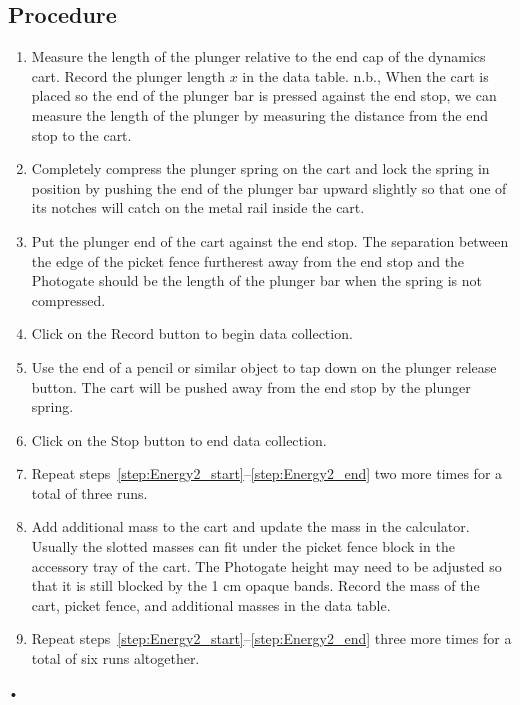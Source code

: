 \documentclass[main.tex]{subfiles}
\begin{document}
\subsection*{Procedure}
\begin{enumerate}
\item
Measure the length of the plunger relative to the end cap of the dynamics cart. Record the plunger length $x$ in the data table. n.b., When the cart is placed so the end of the plunger bar is pressed against the end stop, we can measure the length of the plunger by measuring the distance from the end stop to the cart.
\item \label{step:Energy2_start}
Completely compress the plunger spring on the cart and lock the spring in position by pushing the end of the plunger bar upward slightly so that one of its notches will catch on the metal rail inside the cart.
\item
Put the plunger end of the cart against the end stop. The separation between the edge of the picket fence furtherest away from the end stop and the Photogate should be the length of the plunger bar when the spring is not compressed.
\item
Click on the Record button to begin data collection.
\item
Use the end of a pencil or similar object to tap down on the plunger release button. The cart will be pushed away from the end stop by the plunger spring.
\item \label{step:Energy2_end}
Click on the Stop button to end data collection.
\item
Repeat steps~\ref{step:Energy2_start}--\ref{step:Energy2_end} two more times for a total of three runs.
\item
Add additional mass to the cart and update the mass in the calculator. Usually the slotted masses can fit under the picket fence block in the accessory tray of the cart. The Photogate height may need to be adjusted so that it is still blocked by the 1 cm opaque bands.  Record the mass of the cart, picket fence, and additional masses in the data table.
\item
Repeat steps~\ref{step:Energy2_start}--\ref{step:Energy2_end} three more times for a total of six runs altogether.
\end{enumerate}•
\end{document}

